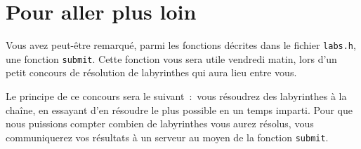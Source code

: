 \documentclass[a4paper]{article}
\newenvironment{objectif}{%
  \begin{framed}%
  \noindent{\bf Objectifs du jour~:}%
}{%
  \end{framed}%
}
\begin{document}







\section{Pour aller plus loin}

Vous avez peut-être remarqué, parmi les fonctions décrites dans le fichier \verb|labs.h|, une fonction \verb|submit|. Cette fonction vous sera utile vendredi matin, lors d'un petit concours de résolution de labyrinthes qui aura lieu entre vous.

Le principe de ce concours sera le suivant : vous résoudrez des labyrinthes à la chaîne, en essayant d'en résoudre le plus possible en un temps imparti. Pour que nous puissions compter combien de labyrinthes vous aurez résolus, vous communiquerez vos résultats à un serveur au moyen de la fonction \verb|submit|.
\end{document}
